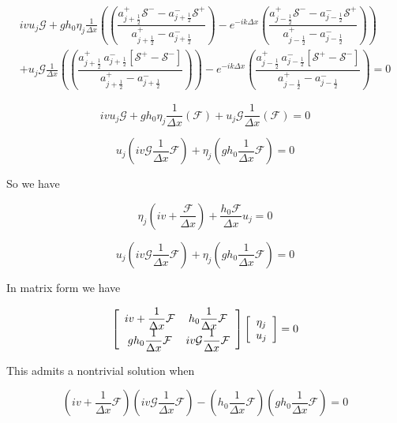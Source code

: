 \documentclass[12pt]{article}
\begin{document}
\begin{multline}
iv u_j\mathcal{G} + gh_0\eta_j \frac{1}{\Delta x} \left(  \left(\dfrac{a^+_{j+\frac{1}{2}} \mathcal{S^-} - a^-_{j+\frac{1}{2}} \mathcal{S^+} }{a^+_{j+\frac{1}{2}} - a^-_{j+\frac{1}{2}}}\right) 
- e^{-ik\Delta x} \left(\dfrac{a^+_{j-\frac{1}{2}} \mathcal{S^-} - a^-_{j-\frac{1}{2}} \mathcal{S^+} }{a^+_{j-\frac{1}{2}} - a^-_{j-\frac{1}{2}}}\right)  \right)\\
+ u_j\mathcal{G} \frac{1}{\Delta x}\left( \left(\dfrac{a^+_{j+\frac{1}{2}} \, a^-_{j+\frac{1}{2}}\left [ \mathcal{S^+} -\mathcal{S^-} \right ] }{a^+_{j+\frac{1}{2}} - a^-_{j+\frac{1}{2}}}\right) \right) 
- e^{-ik\Delta x}\left(\dfrac{a^+_{j-\frac{1}{2}} \, a^-_{j-\frac{1}{2}}\left [ \mathcal{S^+} -\mathcal{S^-} \right ] }{a^+_{j-\frac{1}{2}} - a^-_{j-\frac{1}{2}}}\right) = 0
\end{multline}

\[
iv u_j\mathcal{G} + gh_0 \eta_j \frac{1}{\Delta x} \left(  \mathcal{F}  \right) + u_j\mathcal{G} \frac{1}{\Delta x}\left( \mathcal{F} \right) = 0
\]


\[ u_j\left(iv\mathcal{G} \frac{1}{\Delta x} \mathcal{F}\right)
 + \eta_j \left( gh_0 \frac{1}{\Delta x}  \mathcal{F}  \right) = 0
\]

So we have


\[
\eta_j\left(iv + \frac{\mathcal{F}}{\Delta x}  \right) + \frac{h_0\mathcal{F}}{\Delta x} u_j  = 0
\]

\[ u_j\left(iv\mathcal{G} \frac{1}{\Delta x} \mathcal{F}\right)
+ \eta_j \left( gh_0 \frac{1}{\Delta x}  \mathcal{F}  \right) = 0
\]

In matrix form we have

\[ 
\left[\begin{array}{c c}
iv + \dfrac{1}{\Delta x} \mathcal{F}  &  h_0\dfrac{1}{\Delta x} \mathcal{F} \\
gh_0 \dfrac{1}{\Delta x}  \mathcal{F} & iv\mathcal{G} \dfrac{1}{\Delta x} \mathcal{F}
\end{array}\right]
 \left[\begin{array}{c}
\eta_j \\
u_j
\end{array}\right] = 0
\]

This admits a nontrivial solution when

\[\left(iv + \dfrac{1}{\Delta x} \mathcal{F}\right)\left(iv\mathcal{G} \dfrac{1}{\Delta x} \mathcal{F}\right) - \left(h_0\dfrac{1}{\Delta x} \mathcal{F}\right)\left(gh_0 \dfrac{1}{\Delta x}  \mathcal{F}\right)  =0\]
\end{document}
